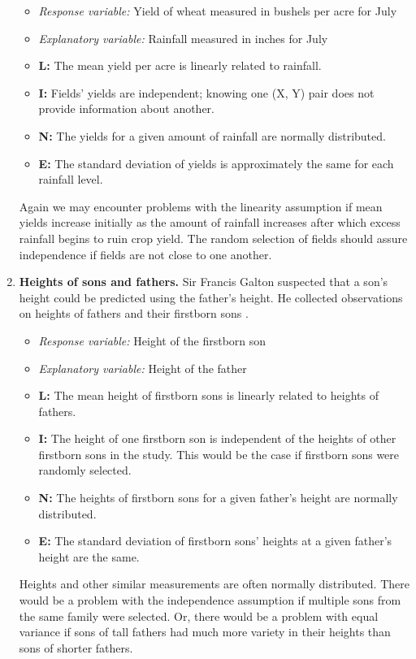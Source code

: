 \documentclass[
]{krantz}
\begin{document}
\begin{enumerate}
  \begin{itemize}
  \item
    \emph{Response variable:} Yield of wheat measured in bushels per acre for July
  \item
    \emph{Explanatory variable:} Rainfall measured in inches for July
  \item
    \textbf{L:} The mean yield per acre is linearly related to rainfall.
  \item
    \textbf{I:} Fields' yields are independent; knowing one (X, Y) pair does not provide information about another.
  \item
    \textbf{N:} The yields for a given amount of rainfall are normally distributed.
  \item
    \textbf{E:} The standard deviation of yields is approximately the same for each rainfall level.
  \end{itemize}

  Again we may encounter problems with the linearity assumption if mean yields increase initially as the amount of rainfall increases after which excess rainfall begins to ruin crop yield. The random selection of fields should assure independence if fields are not close to one another.
\item
  \textbf{Heights of sons and fathers.} Sir Francis Galton suspected that a son's height could be predicted using the father's height. He collected observations on heights of fathers and their firstborn sons \citep{Stigler2002}.

  \begin{itemize}
  \item
    \emph{Response variable:} Height of the firstborn son
  \item
    \emph{Explanatory variable:} Height of the father
  \item
    \textbf{L:} The mean height of firstborn sons is linearly related to heights of fathers.
  \item
    \textbf{I:} The height of one firstborn son is independent of the heights of other firstborn sons in the study. This would be the case if firstborn sons were randomly selected.
  \item
    \textbf{N:} The heights of firstborn sons for a given father's height are normally distributed.
  \item
    \textbf{E:} The standard deviation of firstborn sons' heights at a given father's height are the same.
  \end{itemize}

  Heights and other similar measurements are often normally distributed. There would be a problem with the independence assumption if multiple sons from the same family were selected. Or, there would be a problem with equal variance if sons of tall fathers had much more variety in their heights than sons of shorter fathers.
\end{enumerate}
\end{document}

